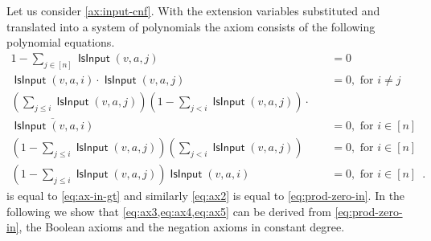 \documentclass[10pt,a4paper]{article}
\theoremstyle{plain}
\theoremstyle{remark}
\theoremstyle{definition}
\newcommand{\eqperiod}{\enspace .}
\newcommand{\vars}[1]{\mathsf{#1}}
\DeclareMathOperator{\isvar}{\vars{IsInput}}
\begin{document}
Let us consider \cref{ax:input-cnf}. With the extension variables
substituted and translated into a system of polynomials the axiom
consists of the following polynomial equations.
\begin{align}
  \label{eq:ax1}
  1 - \sum_{j \in [n]} \isvar(v,a,j) &= 0\\
  \label{eq:ax2}
  \isvar(v,a,i) \cdot \isvar(v,a,j) &= 0,
  \text{ for~}i \neq j\\
  \nonumber
  \left(\sum_{j \le i} \isvar(v,a,j)\right)
  \left(1 - \sum_{j < i} \isvar(v,a,j)\right)\cdot\quad&\\
  \label{eq:ax3}
  \overline{\isvar(v,a,i)} &= 0,
  \text{ for~}i \in [n]\\
  \label{eq:ax4}
  \left(1 - \sum_{j \le i} \isvar(v,a,j)\right)
  \left(\sum_{j < i} \isvar(v,a,j)\right) &= 0,
  \text{ for~}i \in [n]\\
  \label{eq:ax5}
  \left(1 - \sum_{j \le i} \isvar(v,a,j)\right)
  \isvar(v,a,i) &= 0,
  \text{ for~}i \in [n] \eqperiod
\end{align}
 is equal to \cref{eq:ax-in-gt} and similarly
\cref{eq:ax2} is equal to \cref{eq:prod-zero-in}. In the following we
show that \cref{eq:ax3,eq:ax4,eq:ax5} can be derived from
\cref{eq:prod-zero-in}, the Boolean axioms and the negation axioms in
constant degree.
\end{document}
